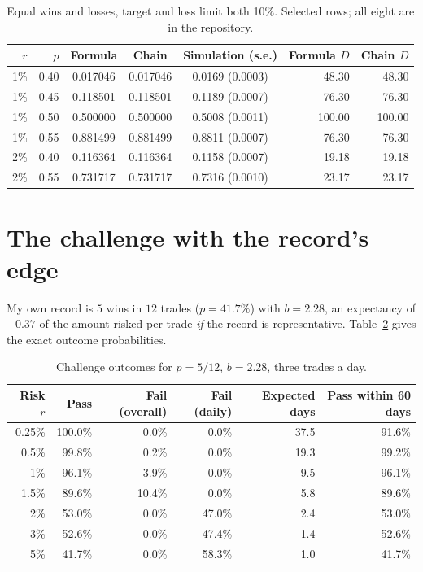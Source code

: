 \documentclass[11pt,a4paper]{article}
\begin{document}
\begin{table}[h]
\centering
\caption{Equal wins and losses, target and loss limit both 10\%. Selected rows; all
eight are in the repository.}
\label{tab:validation}
\begin{tabular}{rrcccrr}
\toprule
$r$ & $p$ & Formula & Chain & Simulation (s.e.) & Formula $D$ & Chain $D$\\
\midrule
1\% & 0.40 & 0.017046 & 0.017046 & 0.0169 (0.0003) & 48.30 & 48.30\\
1\% & 0.45 & 0.118501 & 0.118501 & 0.1189 (0.0007) & 76.30 & 76.30\\
1\% & 0.50 & 0.500000 & 0.500000 & 0.5008 (0.0011) & 100.00 & 100.00\\
1\% & 0.55 & 0.881499 & 0.881499 & 0.8811 (0.0007) & 76.30 & 76.30\\
2\% & 0.40 & 0.116364 & 0.116364 & 0.1158 (0.0007) & 19.18 & 19.18\\
2\% & 0.55 & 0.731717 & 0.731717 & 0.7316 (0.0010) & 23.17 & 23.17\\
\bottomrule
\end{tabular}
\end{table}

\section{The challenge with the record's edge}

My own record is $5$ wins in $12$ trades ($p = 41.7\%$) with $b = 2.28$, an expectancy of
$+0.37$ of the amount risked per trade \emph{if} the record is representative.
Table~\ref{tab:challenge} gives the exact outcome probabilities.

\begin{table}[h]
\centering
\caption{Challenge outcomes for $p = 5/12$, $b = 2.28$, three trades a day.}
\label{tab:challenge}
\begin{tabular}{rrrrrr}
\toprule
Risk $r$ & Pass & Fail (overall) & Fail (daily) & Expected days & Pass within 60 days\\
\midrule
0.25\% & 100.0\% & 0.0\% & 0.0\% & 37.5 & 91.6\%\\
0.5\% & 99.8\% & 0.2\% & 0.0\% & 19.3 & 99.2\%\\
1\% & 96.1\% & 3.9\% & 0.0\% & 9.5 & 96.1\%\\
1.5\% & 89.6\% & 10.4\% & 0.0\% & 5.8 & 89.6\%\\
2\% & 53.0\% & 0.0\% & 47.0\% & 2.4 & 53.0\%\\
3\% & 52.6\% & 0.0\% & 47.4\% & 1.4 & 52.6\%\\
5\% & 41.7\% & 0.0\% & 58.3\% & 1.0 & 41.7\%\\
\bottomrule
\end{tabular}
\end{table}
\end{document}
